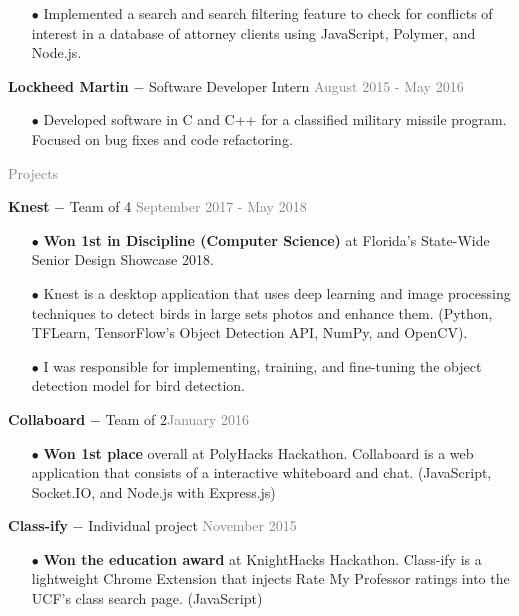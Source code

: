\documentclass[11pt]{article}
\newcommand{\rsection}[1]{\vspace{1.5em}\textcolor{gray}{\Large \robotoslab #1}\vspace{0.5em}}
\newcommand{\bt}[1]{\textbf{#1}} %
\newcommand{\gap}[0]{\vspace{0.3em}} %
\newcommand{\dash}[0]{ $-$ } %
\newcommand{\gray}[1]{\textcolor{gray}{#1}}
\begin{document}
\begin{itemize}
\item[$\bullet$] Implemented a search and search filtering feature to check for conflicts of interest in a database of attorney clients using JavaScript, Polymer, and Node.js.
\end{itemize}

\gap

\bt{Lockheed Martin} \dash Software Developer Intern \hfill \gray{August 2015 - May 2016}

\begin{itemize}
\item[$\bullet$] Developed software in C and C++ for a classified military missile program. Focused on bug fixes and code refactoring.
\end{itemize}

\rsection{Projects}

\bt{Knest}\dash Team of 4 \hfill \gray{September 2017 - May 2018}

\begin{itemize}
\item[$\bullet$] \textbf{Won 1st in Discipline (Computer Science)} at Florida's State-Wide Senior Design Showcase 2018.
\item[$\bullet$] Knest is a desktop application that uses deep learning and image processing techniques to detect birds in large sets photos and enhance them. (Python, TFLearn, TensorFlow's Object Detection API, NumPy, and OpenCV).
\item[$\bullet$] I was responsible for implementing, training, and fine-tuning the object detection model for bird detection.
\end{itemize}

\gap

\bt{Collaboard}\dash Team of 2\hfill \gray{January 2016}

\begin{itemize}
\item[$\bullet$] \textbf{Won 1st place} overall at PolyHacks Hackathon. Collaboard is a web application that consists of a interactive whiteboard and chat. (JavaScript, Socket.IO, and Node.js with Express.js)
\end{itemize}

\gap

\bt{Class-ify}\dash Individual project \hfill \gray{November 2015}

\begin{itemize}
\item[$\bullet$] \textbf{Won the education award} at KnightHacks Hackathon. Class-ify is a lightweight Chrome Extension that injects Rate My Professor ratings into the UCF's class search page. (JavaScript)
\end{itemize}
\end{document}
